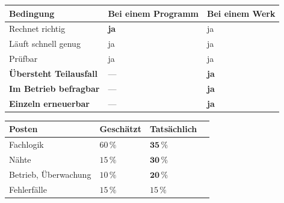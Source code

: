 \begin{aufgabe}
\begin{center}
{\small
\renewcommand{\arraystretch}{1.5}
\begin{tabular}{@{}P{3.2cm}P{2.2cm}P{2.6cm}@{}}
\toprule
\textbf{Bedingung} & \textbf{Bei einem Programm} & \textbf{Bei einem Werk}\\
\midrule
Rechnet richtig & \textcolor{gruen}{\textbf{ja}} & \textcolor{gruen}{ja}\\
Läuft schnell genug & \textcolor{gruen}{ja} & \textcolor{gruen}{ja}\\
Prüfbar & \textcolor{gruen}{ja} & \textcolor{gruen}{ja}\\
\textbf{Übersteht Teilausfall} & --- & \textcolor{gruen}{\textbf{ja}}\\
\textbf{Im Betrieb befragbar} & --- & \textcolor{gruen}{\textbf{ja}}\\
\textbf{Einzeln erneuerbar} & --- & \textcolor{gruen}{\textbf{ja}}\\
\bottomrule
\end{tabular}}
\end{center}

\begin{center}
\begin{minipage}{0.88\textwidth}
\end{minipage}
\end{center}

\begin{center}
\end{center}

\begin{warnung}
\begin{center}
\renewcommand{\arraystretch}{1.45}
\begin{tabular}{@{}P{2.8cm}P{2.2cm}P{2.4cm}P{1.8cm}@{}}
\toprule
\textbf{Posten} & \textbf{Geschätzt} & \textbf{Tatsächlich} & \\
\midrule
Fachlogik & $60\,\%$ & $\mathbf{35\,\%}$ & \\
Nähte & \textcolor{akzent}{$15\,\%$} & \textcolor{akzent}{$\mathbf{30\,\%}$} & \\
Betrieb, Überwachung & $10\,\%$ & $\mathbf{20\,\%}$ & \\
Fehlerfälle & $15\,\%$ & $15\,\%$ & \\
\bottomrule
\end{tabular}
\end{center}


\end{warnung}
\end{aufgabe}
